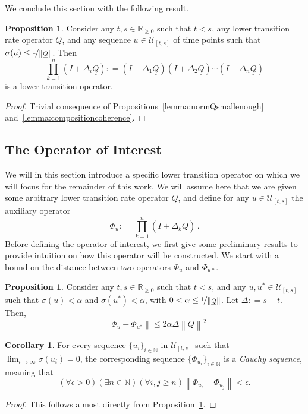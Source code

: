 \documentclass[10pt]{paper}
\theoremstyle{definition}
\newtheorem{proposition}[theorem]{Proposition}
\newtheorem{corollary}[theorem]{Corollary}
\newcommand{\nats}{\mathbb{N}}
\newcommand{\reals}{\mathbb{R}}
\newcommand{\realsnonneg}{\reals_{\geq 0}}
\newcommand{\lrate}{\underline{Q}}
\newcommand{\norm}[1]{\left\lVert #1 \right\rVert}
\newcommand{\coloneqq}{:\!=}
\begin{document}
\noindent We conclude this section with the following result.
\begin{proposition}\label{lemma:productiscoherent}
Consider any $t,s\in\realsnonneg$ such that $t<s$, any lower transition rate operator $\lrate$, and any sequence $u\in\mathcal{U}_{[t,s]}$ of time points such that $\sigma(u)\leq\nicefrac{1}{\norm{\lrate}}$. Then
\begin{equation*}
\prod_{k=1}^n(I+\Delta_i\lrate)\coloneqq (I+\Delta_1\lrate)(I+\Delta_2\lrate)\cdots (I+\Delta_n\lrate)
\end{equation*}
is a lower transition operator.
\end{proposition}
\begin{proof}
Trivial consequence of Propositions~\ref{lemma:normQsmallenough} and~\ref{lemma:compositioncoherence}.
\end{proof}

\subsection{The Operator of Interest}

We will in this section introduce a specific lower transition operator on which we will focus for the remainder of this work. We will assume here that we are given some arbitrary lower transition rate operator $\lrate$, and define for any $u\in\mathcal{U}_{[t,s]}$ the auxiliary operator
\begin{equation*}
\Phi_u\coloneqq\prod_{k=1}^n(I+\Delta_k\lrate)\,.
\end{equation*}
Before defining the operator of interest, we first give some preliminary results to provide intuition on how this operator will be constructed. We start with a bound on the distance between two operators $\Phi_u$ and $\Phi_{u*}$.

\begin{proposition}\label{prop:differencebetweenu}
Consider any $t,s\in\realsnonneg$ such that $t<s$, and any $u,u^*\in\mathcal{U}_{[t,s]}$ such that $\sigma(u)<\alpha$ and $\sigma(u^*)<\alpha$, with $0<\alpha\leq\nicefrac{1}{\norm{\lrate}}$. Let $\Delta\coloneqq s-t$. Then,
\begin{equation*}
\norm{\Phi_u-\Phi_{u^*}}\leq 2\alpha\Delta\norm{\lrate}^2
\end{equation*}
\end{proposition}

\begin{corollary}\label{corol:cauchy}
For every sequence $\{u_i\}_{i\in\nats}$ in $\mathcal{U}_{[t,s]}$ such that $\lim_{i\to\infty}\sigma(u_i)=0$, the corresponding sequence $\{\Phi_{u_i}\}_{i\in\nats}$ is a \emph{Cauchy sequence}, meaning that
\begin{equation*}
(\forall \epsilon>0)(\exists n\in\nats)(\forall i,j\geq n)
\norm{\Phi_{u_i}-\Phi_{u_j}}<\epsilon.
\end{equation*}
\end{corollary}
\begin{proof}
This follows almost directly from Proposition~\ref{prop:differencebetweenu}.
\end{proof}
\end{document}
